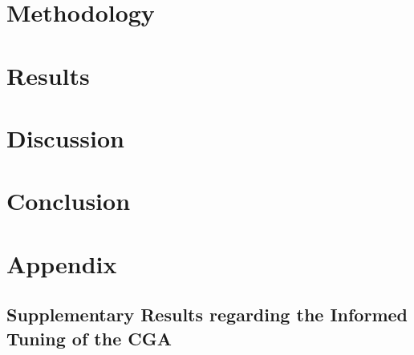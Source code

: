 \documentclass[10pt]{article}
\begin{document}
\section{Methodology}
\label{sec:CGA_QEG_comparison}
\section{Results}
\section{Discussion}
\section{Conclusion}

\newpage
\section{Appendix}
\subsection{Supplementary Results regarding the Informed Tuning of the CGA}
\end{document}
